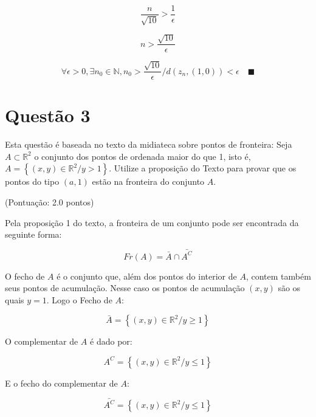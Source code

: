 \documentclass[10pt,a4paper]{article}
\begin{document}
	\begin{equation}
		\frac{n}{\sqrt{10}} > \frac{1}{\epsilon}
	\end{equation}
	
	\begin{equation}\label{eq:restricao}
		n > \frac{\sqrt{10}}{\epsilon}
	\end{equation}
	
	\begin{equation}
		\forall \epsilon > 0, \exists n_0 \in \mathbb{N}, n_0 > \frac{\sqrt{10}}{\epsilon} / d\left(z_n, \left(1, 0\right)\right) < \epsilon \quad \blacksquare
	\end{equation}
	
	\section{Questão 3}
	
	Esta questão é baseada no texto da midiateca sobre pontos de fronteira: Seja $ A \subset \mathbb{R}^2 $ o conjunto dos pontos de ordenada maior do que 1, isto é, $ A = \left\{ (x, y) \in \mathbb{R}^2  / y > 1\right\} $. Utilize a proposição do Texto para provar que os pontos do tipo $(a, 1)$ estão na fronteira do conjunto $A$.
	
	(Pontuação: 2.0 pontos)
	
	Pela proposição 1 do texto, a fronteira de um conjunto pode ser encontrada da seguinte forma:
	
	\begin{equation} \label{eq:proposicao1}
		Fr(A) = \bar{A} \cap \bar{A^C}
	\end{equation}
	
	O fecho de $A$ é o conjunto que, além dos pontos do interior de $A$, contem também seus pontos de acumulação. Nesse caso os pontos de acumulação $(x, y)$ são os quais $y = 1$. Logo o Fecho de $A$:
	
	\begin{equation}
		\bar{A} = \left\{ (x, y) \in \mathbb{R}^2 / y \ge 1 \right\}
	\end{equation}
	
	O complementar de $A$ é dado por:
	
	\begin{equation}
		A^C = \left\{ (x, y) \in \mathbb{R}^2 / y \le 1 \right\}
	\end{equation}
	
	E o fecho do complementar de $A$:
	
	\begin{equation}
		\bar{A^C} = \left\{ (x, y) \in \mathbb{R}^2 / y \le 1 \right\}
	\end{equation}
	
\end{document}
